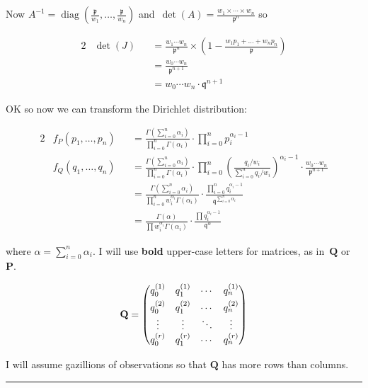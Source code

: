 \documentclass[nojss]{jss}
\DeclareMathOperator{\diag}{diag}
\begin{document}
Now $A^{-1} =
\diag\left(\frac{\mathfrak{p}}{w_1},\ldots,\frac{\mathfrak{p}}{w_n}\right)$
and~$\det(A)=\frac{w_1\times\cdots\times w_n}{\mathfrak{p}^n}$ so

\begin{alignat}{2}
&  \det(J) &&=   \frac{w_1\cdots w_n}{\mathfrak{p}^n}\times\left(1-\frac{w_1p_1+\ldots+w_np_n}{\mathfrak{p}}\right)\\
&          &&=   \frac{w_0\cdots w_n}{\mathfrak{p}^{n+1}}\\
&          &&=   w_0\cdots w_n\cdot\mathfrak{q}^{n+1}
\end{alignat}

OK so now we can transform the Dirichlet distribution:


  \begin{alignat}{2}
& f_P(p_1,\ldots,p_n) &&=\frac{\Gamma(\sum_{i=0}^n\alpha_i)}{\prod_{i=0}^n\Gamma(\alpha_i)}\cdot\prod_{i=0}^np_i^{\alpha_i-1}\\
& f_Q(q_1,\ldots,q_n) &&= \frac{\Gamma(\sum_{i=0}^n\alpha_i)}{\prod_{i=0}^n\Gamma(\alpha_i)}\cdot \prod_{i=0}^n\left(\frac{q_i/w_i}{\sum_{i=0}^nq_i/w_i}\right)^{\alpha_i-1}\cdot\frac{w_0\cdots w_n}{\mathfrak{p}^{n+1}}\\
                   &  &&= \frac{\Gamma(\sum_{i=0}^n\alpha_i)}{\prod_{i=0}^nw_i^{\alpha_i}\Gamma(\alpha_i)}\cdot \frac{\prod_{i=0}^nq_i^{\alpha_i-1}}{\mathfrak{q}^{\sum_{i=0}^n\alpha_i}}\\
                   &  &&= \frac{\Gamma(\alpha)}{\prod w_i^{\alpha_i}\Gamma(\alpha_i)}\cdot\frac{\prod q_i^{\alpha_i-1}}{\mathfrak{q}^{\alpha}}
\end{alignat}

where $\alpha=\sum_{i=0}^n\alpha_i$.  I will use {\bf bold} upper-case
letters for matrices, as in~$\mathbf{Q}$ or~$\mathbf{P}$.

\begin{equation}
  \mathbf{Q}=
  \begin{pmatrix}
    q_0^{(1)} & q_1^{(1)} & \cdots & q_n^{(1)} \\
    q_0^{(2)} & q_1^{(2)} & \cdots & q_n^{(2)\vphantom{h^{h^h}}} \\
    \vdots  & \vdots  & \ddots & \vdots  \\
    q_0^{(r)} & q_1^{(r)} & \cdots & q_n^{(r)} \\
  \end{pmatrix}
\end{equation}

I will assume gazillions of observations so that $\mathbf{Q}$ has more
rows than columns.  \rule{6mm}{10mm}
\end{document}

